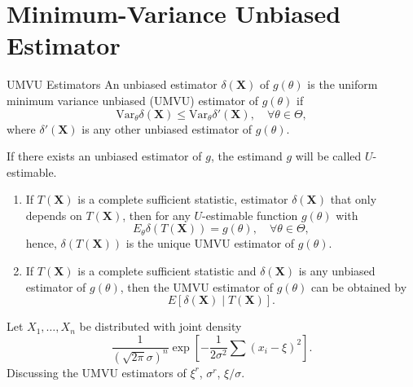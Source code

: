 \chapter{Minimum-Variance Unbiased Estimator}

\begin{definition}{UMVU Estimators}{}
    An unbiased estimator $\delta(\textbf{X})$ of $g(\theta)$ is the uniform minimum variance unbiased (UMVU) estimator of $g(\theta)$ if
    \begin{equation}
        \text{Var}_{\theta}\delta(\textbf{X})\leq\text{Var}_{\theta}\delta'(\textbf{X}),\quad\forall\theta\in\Theta,
    \end{equation}
    where $\delta'(\textbf{X})$ is any other unbiased estimator of $g(\theta)$.
\end{definition}

\begin{note}
    If there exists an unbiased estimator of $g$, the estimand $g$ will be called $U$-estimable.
\end{note}

\begin{enumerate}
    \item If $T(\textbf{X})$ is a complete sufficient statistic, estimator $\delta(\textbf{X})$ that only depends on $T(\textbf{X})$, then for any $U$-estimable function $g(\theta)$ with
          \begin{equation}
              E_{\theta}\delta(T(\textbf{X}))=g(\theta),\quad\forall\theta\in\Theta,
          \end{equation}
          hence, $\delta(T(\textbf{X}))$ is the unique UMVU estimator of $g(\theta)$.
    \item If $T(\textbf{X})$ is a complete sufficient statistic and $\delta({\textbf{X}})$ is any unbiased estimator of $g(\theta)$, then the UMVU estimator of $g(\theta)$ can be obtained by
          \begin{equation}
              E\left[\delta(\textbf{X})\mid T(\textbf{X})\right].
          \end{equation}
\end{enumerate}

\begin{example}
    Let $X_{1},\ldots,X_{n}$ be distributed with joint density
    \begin{equation}
        \frac{1}{(\sqrt{2\pi}\sigma)^{n}}\exp\left[-\frac{1}{2\sigma^{2}}\sum\left(x_{i}-\xi\right)^{2}\right].
    \end{equation}
    Discussing the UMVU estimators of $\xi^r$, $\sigma^r$, $\xi/\sigma$.
\end{example}

